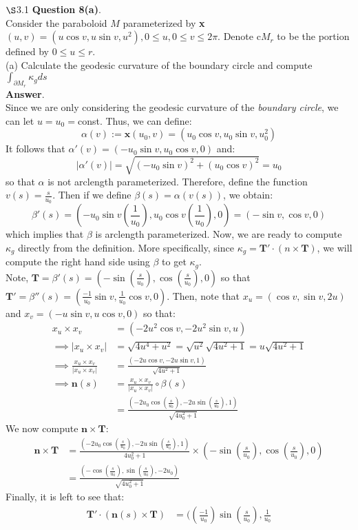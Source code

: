 \documentclass{article}
\begin{document}
    $\S$3.1 \textbf{Question 8(a)}.\\
    Consider the paraboloid $M$ parameterized by \textbf{x}$(u,v) = (u\cos{v},u\sin{v},u^2),0\leq u,0\leq v\leq 2\pi$. Denote
    c$M_r$ to be the portion defined by $0\leq u\leq r$.\\
    (a) Calculate the geodesic curvature of the boundary circle and compute $\int_{\partial{M_r}}\kappa_gds$\\

    \textbf{Answer}.\\
    Since we are only considering the geodesic curvature of the \textit{boundary circle}, we can let $u=u_0=$const. Thus, we can
    define:
    \[ \alpha(v) := \mathbf{x}(u_0,v) = (u_0\cos{v},u_0\sin{v},u_0^2) \]
    It follows that $\alpha'(v) = (-u_0\sin{v},u_0\cos{v},0)$ and:
    \[ |\alpha'(v)| = \sqrt{(-u_0\sin{v})^2 + (u_0\cos{v})^2} = u_0 \]
    so that $\alpha$ is not arclength parameterized. Therefore, define the function $v(s) = \frac{s}{u_0}$. Then if we define
    $\beta(s) = \alpha(v(s))$, we obtain:
    \[ \beta'(s) = (-u_0\sin{v}(\frac{1}{u_0}),u_0\cos{v}(\frac{1}{u_0}),0) = (-\sin{v},\cos{v},0)\]
    which implies that $\beta$ is arclength parameterized. Now, we are ready to compute $\kappa_g$ directly from the definition.
    More specifically, since $\kappa_g = \mathbf{T}' \cdot (n\times \mathbf{T})$, we will compute the right hand side using $\beta$
    to get $\kappa_g$.\\
    Note, $\mathbf{T} = \beta'(s) = (-\sin{(\frac{s}{u_0})},\cos{(\frac{s}{u_0})},0)$ so that $\mathbf{T}' = \beta''(s) =
    (\frac{-1}{u_0}\sin{v},\frac{1}{u_0}\cos{v},0)$. Then, note that $x_u = (\cos{v},\sin{v},2u)$ and $x_v = (-u\sin{v},u\cos{v},0)$
    so that:
    \begin{align*}
        x_u \times x_v &= (-2u^2\cos{v},-2u^2\sin{v},u) \\
        \implies |x_u\times x_v| &= \sqrt{4u^4+u^2} = \sqrt{u^2}\sqrt{4u^2+1} = u\sqrt{4u^2+1}\\
        \implies \frac{x_u\times x_v}{|x_u\times x_v|} &= \frac{(-2u\cos{v},-2u\sin{v},1)}{\sqrt{4u^2+1}}\\
        \implies \mathbf{n}(s) &= \frac{x_u\times x_v}{|x_u\times x_v|} \circ \beta(s) \\
        &= \frac{(-2u_0\cos{(\frac{s}{u_0})},-2u\sin{(\frac{s}{u_0})},1)}{\sqrt{4u_0^2+1}}
    \end{align*}
    We now compute $\mathbf{n}\times\mathbf{T}$:
    \begin{align*}
        \mathbf{n}\times\mathbf{T} &= \frac{(-2u_0\cos{(\frac{s}{u_0})},-2u\sin{(\frac{s}{u_0})},1)}{4u_0^2+1} \times 
        (-\sin{(\frac{s}{u_0})},\cos{(\frac{s}{u_0})},0) \\
        &= \frac{(-\cos{(\frac{s}{u_0})},\sin{(\frac{s}{u_0})},-2u_0)}{\sqrt{4u_0^2+1}}
    \end{align*}
    Finally, it is left to see that:
    \begin{align*}
        \mathbf{T}'\cdot (\mathbf{n}(s) \times \mathbf{T}) &= ((\frac{-1}{u_0})\sin{(\frac{s}{u_0})},\frac{1}{u_0}
    \end{align*}
\end{document}
